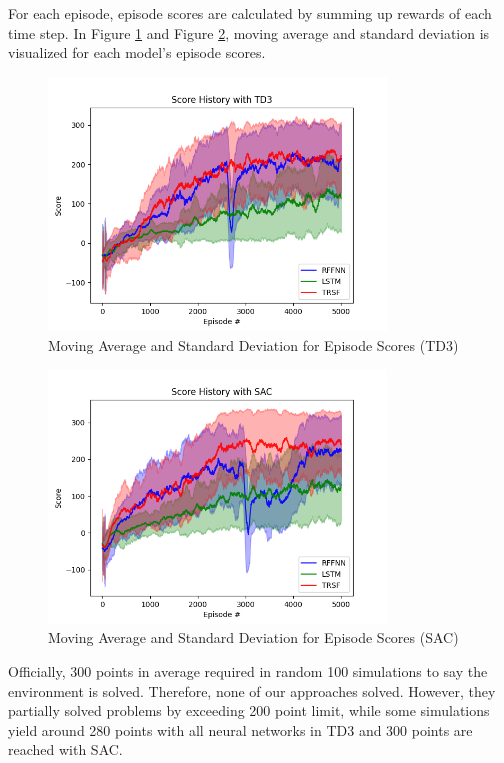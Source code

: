 \documentclass[a4paper, 12pt]{article} %
\begin{document}
For each episode, episode scores are calculated by summing up rewards of each time step. 
In Figure \ref{fig:td3_std_ep_rewards} and Figure \ref{fig:sac_std_ep_rewards}, moving average and standard deviation is visualized for each model's episode scores. 

\begin{figure}
	\centering
	\includegraphics[width=0.8\textwidth]{figures/bipedal/STD_TD3_RFFNN_LSTM_TRSF.png}
	\caption{Moving Average and Standard Deviation for Episode Scores (TD3)}
	\label{fig:td3_std_ep_rewards}
\end{figure} 

\begin{figure}
	\centering
	\includegraphics[width=0.8\textwidth]{figures/bipedal/STD_SAC_RFFNN_LSTM_TRSF.png}
	\caption{Moving Average and Standard Deviation for Episode Scores (SAC)}
	\label{fig:sac_std_ep_rewards}
\end{figure} 

Officially, 300 points in average required in random 100 simulations to say the environment is solved.
Therefore, none of our approaches solved.
However, they partially solved problems by exceeding 200 point limit, while some simulations yield around 280 points with all neural networks in TD3 and 300 points are reached with SAC.  
\end{document}
